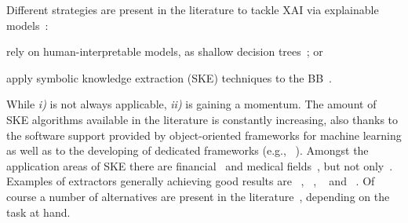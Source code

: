 \documentclass[sigconf]{acmart}
\begin{document}
Different strategies are present in the literature to tackle XAI via explainable models~\cite{guidotti2018survey}:
%
\begin{inlinelist}
	\item rely on human-interpretable models, as shallow decision trees~\cite{Rudin2019}; or
	\item apply symbolic knowledge extraction (SKE) techniques to the BB~\cite{KENNY2021103459}.
\end{inlinelist}
%
While \textit{i)} is not always applicable, \textit{ii)} is gaining a momentum. The amount of SKE algorithms available in the literature is constantly increasing, also thanks to the software support provided by object-oriented frameworks for machine learning 
as well as to the developing of dedicated frameworks (e.g., \psyke{}~\cite{psyke-woa2021,psyke-ia2022,psyke-extraamas2022}).
%
%
Amongst the application areas of SKE there are financial~\cite{baesens2001building,baesens2003using,steiner2006using} and medical fields~\cite{bologna1997three,franco2007early,hayashi2000comparison}, but not only~\cite{setiono2011rule,sabbatini22LPFSKE,azcarraga2012keyword,hofmann2003rule}.
%
Examples of extractors generally achieving good results are \cart{}~\cite{breiman1984classification}, \trepan{}~\cite{craven1996extracting}, \gridex{}~\cite{gridex-extraamas2021} and \gridrex{}~\cite{gridrex-kr2022}.
%
Of course a number of alternatives are present in the literature~\cite{craven1994using,huysmans2006iter,barakat2005eclectic,martens2007comprehensible}, depending on the task at hand.
\end{document}
